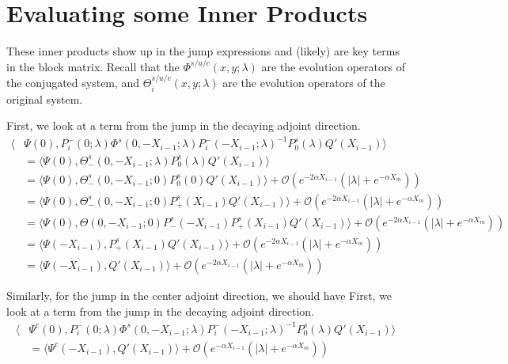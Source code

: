 \documentclass[thesis.tex]{subfiles}
\begin{document}
\section{Evaluating some Inner Products}

These inner products show up in the jump expressions and (likely) are key terms in the block matrix. Recall that the $\Phi^{s/u/c}(x, y; \lambda)$ are the evolution operators of the conjugated system, and $\Theta_i^{s/u/c}(x, y; \lambda)$ are the evolution operators of the original system.

First, we look at a term from the jump in the decaying adjoint direction.
\begin{align*}
\langle &\Psi(0), P_i^-(0; \lambda) \Phi^s(0, -X_{i-1}; \lambda) P_i^-(-X_{i-1}; \lambda)^{-1} P_0^s(\lambda) Q'(X_{i-1})\rangle \\
&= \langle \Psi(0), \Theta_-^s(0, -X_{i-1}; \lambda) P_0^s(\lambda) Q'(X_{i-1})\rangle \\
&= \langle \Psi(0), \Theta_-^s(0, -X_{i-1}; 0) P_0^s(0) Q'(X_{i-1})\rangle + \mathcal{O}(e^{-2\alpha X_{i-1}}(|\lambda| + e^{-\alpha X_m})) \\
&= \langle \Psi(0), \Theta_-^s(0, -X_{i-1}; 0) P^s_+(X_{i-1}) Q'(X_{i-1})\rangle + \mathcal{O}(e^{-2\alpha X_{i-1}}(|\lambda| + e^{-\alpha X_m})) \\
&= \langle \Psi(0), \Theta(0, -X_{i-1}; 0) P^s_-(-X_{i-1}) P^s_+(X_{i-1}) Q'(X_{i-1})\rangle + \mathcal{O}(e^{-2\alpha X_{i-1}}(|\lambda| + e^{-\alpha X_m})) \\
&= \langle \Psi(-X_{i-1}), P^s_+(X_{i-1}) Q'(X_{i-1})\rangle + \mathcal{O}(e^{-2\alpha X_{i-1}}(|\lambda| + e^{-\alpha X_m})) \\
&= \langle \Psi(-X_{i-1}), Q'(X_{i-1})\rangle + \mathcal{O}(e^{-2\alpha X_{i-1}}(|\lambda| + e^{-\alpha X_m})) 
\end{align*}

Similarly, for the jump in the center adjoint direction, we should have
First, we look at a term from the jump in the decaying adjoint direction.
\begin{align*}
\langle &\Psi^c(0), P_i^-(0; \lambda) \Phi^s(0, -X_{i-1}; \lambda) P_i^-(-X_{i-1}; \lambda)^{-1} P_0^s(\lambda) Q'(X_{i-1})\rangle \\
&= \langle \Psi^c(-X_{i-1}), Q'(X_{i-1})\rangle + \mathcal{O}(e^{-\alpha X_{i-1}}(|\lambda| + e^{-\alpha X_m}))
\end{align*}
\end{document}
